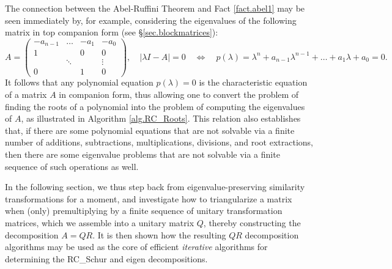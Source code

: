 The connection between the Abel-Ruffini Theorem and Fact \ref{fact.abel1} may be seen immediately by, for example, considering the
eigenvalues of the following matrix in top companion form (see \S \ref{sec.blockmatrices}):
\begin{equation*}
   A=\begin{pmatrix} -a_{n-1} &\ldots &  -a_{1} &  -a_0 \\
                     1        &       & 0         & 0 \\ 
                              &\ddots &           & \vdots \\ 
                     0        &       & 1         & 0 \end{pmatrix}, \quad
  |\lambda I - A|=0 \quad \Leftrightarrow \quad p(\lambda) = \lambda^n + a_{n-1} \lambda^{n-1} + \ldots + a_1 \lambda + a_0 = 0.
\end{equation*}
It follows that any polynomial equation $p(\lambda) = 0$ is the characteristic equation of a matrix $A$ in companion form,
thus allowing one to convert the problem of finding the roots of a polynomial into the problem of computing the eigenvalues of $A$,
as illustrated in Algorithm \ref{alg.RC_Roots}.
This relation also establishes that, if there are some polynomial equations that are not solvable
via a finite number of additions, subtractions, multiplications, divisions, and root extractions,
then there are some eigenvalue problems that are not solvable via a finite sequence of such operations as well.

\begin{figure*}[t]
\end{figure*}

In the following section, we thus step back from eigenvalue-preserving similarity transformations for a moment,
and investigate how to triangularize a matrix when (only) premultiplying by a finite sequence of unitary transformation matrices,
which we assemble into a unitary matrix $Q$, thereby constructing the decomposition $A=QR$.  It is then shown how the
resulting $QR$ decomposition algorithms may be used as the core of efficient {\it iterative} algorithms for determining
the RC_Schur and eigen decompositions.

